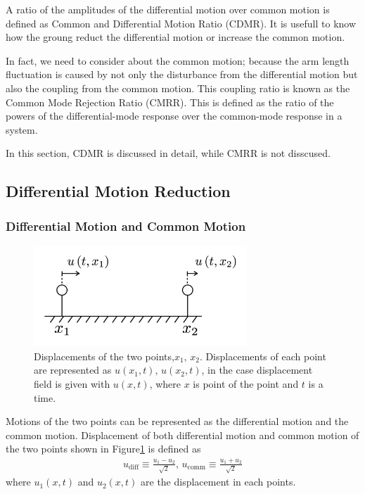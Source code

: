 \documentclass[a4paper,12pt]{book}
\begin{document}
A ratio of the amplitudes of the differential motion over common motion is defined as Common and Differential Motion Ratio (CDMR). It is usefull to know how the groung reduct the differential motion or increase the common motion.

In fact, we need to consider about the common motion; because the arm length fluctuation is caused by not only the disturbance from the differential motion but also the coupling from the common motion. This coupling ratio is known as the Common Mode Rejection Ratio (CMRR). This is defined as the ratio of the powers of the differential-mode response over the common-mode response in a system.

In this section, CDMR is discussed in detail, while CMRR is not disscused.

\subsection{Differential Motion Reduction}
\subsubsection{Differential Motion and Common Motion}
\begin{figure}[H]
  \begin{center}
    \includegraphics[width=8.0cm]{./img_cdmr_arm.png}
  \end{center}
  \caption{Displacements of the two points,$x_1,\,x_2$. Displacements of each point are represented as $u(x_1,t),\, u(x_2,t)$, in the case displacement field is given with $u(x,t)$, where $x$ is point of the point and $t$ is a time.
  }\label{img:img_diffcomm}  
\end{figure}
Motions of the two points can be represented as the differential motion and the common motion. Displacement of both differential motion and common motion of the two points shown in Figure\ref{img:img_diffcomm} is defined as
\begin{eqnarray}\label{eq:eq22}
  u_{\mathrm{diff}} \equiv \frac{u_{1}-u_{2}}{\sqrt{2}}, \,
  u_{\mathrm{comm}}  \equiv \frac{u_{1}+u_{2}}{\sqrt{2}}
\end{eqnarray}
where $u_{1}(x,t)$ and $u_2(x,t)$ are the displacement in each points.
\end{document}
